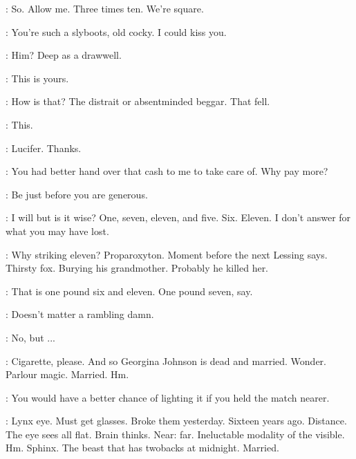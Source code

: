 \Bloom:
So. Allow me.
Three times ten.
We're square.

\Bella:
You're such a slyboots, old cocky.
I could kiss you.

\Zoe:
Him?
Deep as a drawwell.

\Bloom:
This is yours.

\Stephen:
How is that?
The distrait or absentminded beggar.
That fell.

\Bloom:
This.

\Stephen:
Lucifer.
Thanks.

\Bloom:
You had better hand over that cash to me to take care of.
Why pay more?

\Stephen:
Be just before you are generous.

\Bloom:
I will but is it wise?
One, seven, eleven, and five.
Six. Eleven.
I don't answer for what you may have lost.

\Stephen:
Why striking eleven?
Proparoxyton.
Moment before the next Lessing says.
Thirsty fox.
Burying his grandmother.
Probably he killed her.

\Bloom:
That is one pound six and eleven.
One pound seven, say.

\Stephen:
Doesn't matter a rambling damn.

\Bloom:
No, but ...

\Stephen:
Cigarette, please.
And so Georgina Johnson is dead and married.
Wonder.
Parlour magic.
Married.
Hm.

\Lynch:
You would have a better chance of lighting it
if you held the match nearer.

\Stephen:
Lynx eye.
Must get glasses.
Broke them yesterday.
Sixteen years ago.
Distance.
The eye sees all flat.
Brain thinks.
Near: far.
Ineluctable modality of the visible.
Hm.
Sphinx.
The beast that has twobacks at midnight.
Married.


